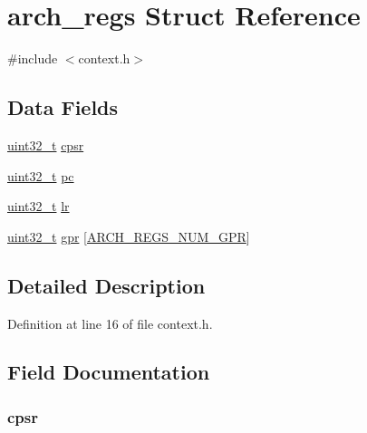 \hypertarget{structarch__regs}{\section{arch\-\_\-regs \-Struct \-Reference}
\label{structarch__regs}
}


{\ttfamily \#include $<$context.\-h$>$}

\subsection*{\-Data \-Fields}
\begin{DoxyCompactItemize}
\item 
\hyperlink{arch__types_8h_a435d1572bf3f880d55459d9805097f62}{uint32\-\_\-t} \hyperlink{structarch__regs_a0d1814f5edf1360a76b54ac386be5e85}{cpsr}
\item 
\hyperlink{arch__types_8h_a435d1572bf3f880d55459d9805097f62}{uint32\-\_\-t} \hyperlink{structarch__regs_afaa20335217fae16f0e22b466017dae1}{pc}
\item 
\hyperlink{arch__types_8h_a435d1572bf3f880d55459d9805097f62}{uint32\-\_\-t} \hyperlink{structarch__regs_a6ced3f4007bb60daf12191c058e55b8c}{lr}
\item 
\hyperlink{arch__types_8h_a435d1572bf3f880d55459d9805097f62}{uint32\-\_\-t} \hyperlink{structarch__regs_a3397c2bbf4a3049cf5bca2831ada10b8}{gpr} \mbox{[}\hyperlink{context_8h_a469821668f7cfd63c2dd4f05120f1ccf}{\-A\-R\-C\-H\-\_\-\-R\-E\-G\-S\-\_\-\-N\-U\-M\-\_\-\-G\-P\-R}\mbox{]}
\end{DoxyCompactItemize}


\subsection{\-Detailed \-Description}


\-Definition at line 16 of file context.\-h.



\subsection{\-Field \-Documentation}
\hypertarget{structarch__regs_a0d1814f5edf1360a76b54ac386be5e85}{
\subsubsection[{cpsr}]{ {\bf cpsr}}}\label{structarch__regs_a0d1814f5edf1360a76b54ac386be5e85}


